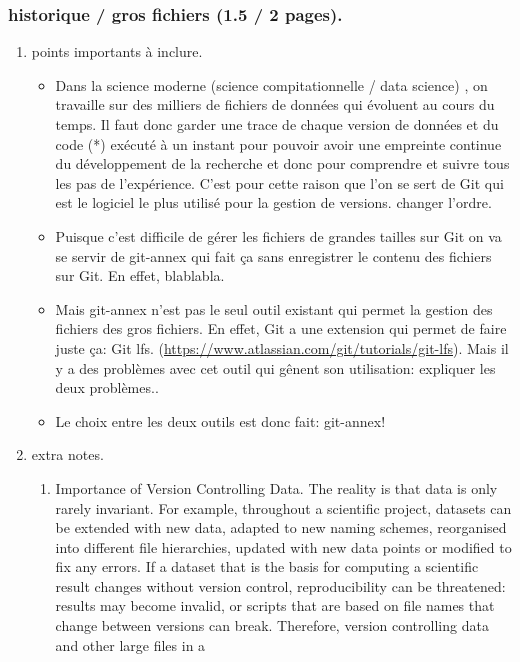 \documentclass[11pt]{article}
\begin{document}
\subsubsection{historique / gros fichiers (1.5 / 2 pages).}
\label{sec:org24380cb}
\begin{enumerate}
\item points importants à inclure.
\label{sec:org57c52a5}
\begin{itemize}
\item Dans la science moderne (science compitationnelle / data
science) , on travaille sur des milliers de
fichiers de données qui évoluent au cours du temps. Il faut donc
garder une trace de chaque version de données et du code (*)
exécuté à un instant pour pouvoir avoir une empreinte continue du
développement de la recherche et donc pour comprendre et suivre
tous les pas de l'expérience. C'est pour cette raison que l'on se sert
de Git qui est le logiciel le plus utilisé pour la gestion de
versions.
changer l'ordre.
\item Puisque c'est difficile de gérer les fichiers de grandes tailles
sur Git on va se servir de git-annex qui fait ça sans
enregistrer le contenu des fichiers sur Git. En effet, blablabla.
\item Mais git-annex n'est pas le seul outil existant qui permet la
gestion des fichiers des gros fichiers. En effet, Git a une
extension qui permet de faire juste ça: Git
lfs. (\url{https://www.atlassian.com/git/tutorials/git-lfs}). Mais il
y a des problèmes avec cet outil qui gênent son utilisation:
expliquer les deux problèmes..
\item Le choix entre les deux outils est donc fait: git-annex!
\end{itemize}
\item extra notes.
\label{sec:org98e0f20}
\begin{enumerate}
\item Importance of Version Controlling Data.
\label{sec:orge07675a}
The reality is that data is only rarely invariant. For example,
throughout a scientific project, datasets can be extended with new
data, adapted to new naming schemes, reorganised into different
file hierarchies, updated with new data points or modified to fix
any errors.
If a dataset that is the basis for computing a scientific result
changes without version control, reproducibility can be threatened:
results may become invalid, or scripts that are based on file names
that change between versions can break.
Therefore, version controlling data and other large files in a

\end{enumerate}
\end{enumerate}
\end{document}
